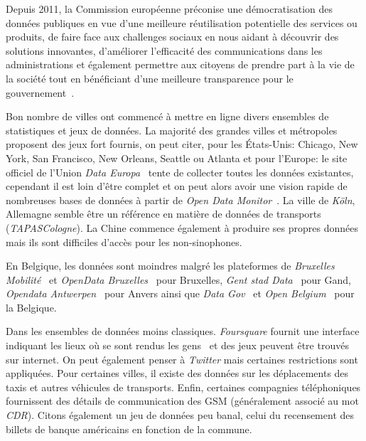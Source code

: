 Depuis 2011, la Commission européenne préconise une démocratisation des données publiques en vue d'une meilleure réutilisation potentielle des services ou produits, de faire face aux challenges sociaux en nous aidant à découvrir des solutions innovantes, d'améliorer l'efficacité des communications dans les administrations et également permettre aux citoyens de prendre part à la vie de la société tout en bénéficiant d'une meilleure transparence pour le gouvernement~\cite{EU-833-2011}.

Bon nombre de villes ont commencé à mettre en ligne divers ensembles de statistiques et jeux de données. La majorité des grandes villes et métropoles proposent des jeux fort fournis, on peut citer, pour les États-Unis: Chicago, New York, San Francisco, New Orleans, Seattle ou Atlanta et pour l'Europe: le site officiel de l'Union \textit{Data Europa}~\cite{DataEuropa} tente de collecter toutes les données existantes, cependant il est loin d'être complet et on peut alors avoir une vision rapide de nombreuses bases de données à partir de \textit{Open Data Monitor}~\cite{OpenDataMonitor}. La ville de \textit{Köln}, Allemagne semble être un référence en matière de données de transports (\textit{TAPASCologne}). La Chine commence également à produire ses propres données mais ils sont difficiles d'accès pour les non-sinophones.

En Belgique, les données sont moindres malgré les plateformes de \textit{Bruxelles Mobilité}~\cite{BrusselsMobility} et \textit{OpenData Bruxelles}~\cite{OpenDataBruxelles} pour Bruxelles, \textit{Gent stad Data}~\cite{DataGent} pour Gand, \textit{Opendata Antwerpen}~\cite{OpenDataAntwerpen} pour Anvers ainsi que \textit{Data Gov}~\cite{DataGov} et \textit{Open Belgium}~\cite{OpenBelgium} pour la Belgique.

Dans les ensembles de données moins classiques. \textit{Foursquare} fournit une interface indiquant les lieux où se sont rendus les gens~\cite{FourSquare} et des jeux peuvent être trouvés sur internet. On peut également penser à \textit{Twitter} mais certaines restrictions sont appliquées. Pour certaines villes, il existe des données sur les déplacements des taxis et autres véhicules de transports. Enfin, certaines compagnies téléphoniques fournissent des détails de communication des GSM (généralement associé au mot \textit{CDR}). Citons également un jeu de données peu banal, celui du recensement des billets de banque américains en fonction de la commune.

